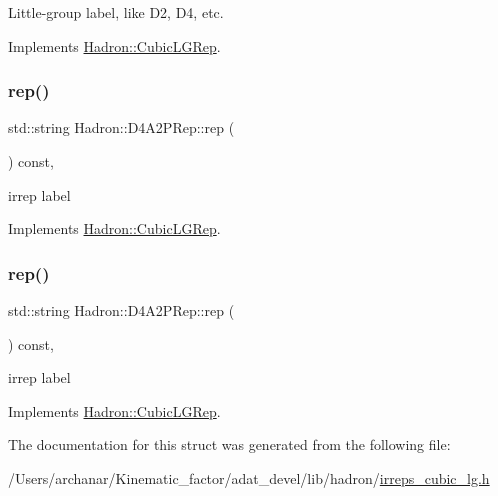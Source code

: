 Little-\/group label, like D2, D4, etc. 

Implements \mbox{\hyperlink{structHadron_1_1CubicLGRep_a9bdb14b519a611d21379ed96a3a9eb41}{Hadron\+::\+Cubic\+L\+G\+Rep}}.

\mbox{\label{structHadron_1_1D4A2PRep_a0d17ee51770f635eb312b9da22dd1c1f}} 
\subsubsection{\texorpdfstring{rep()}{rep()}\hspace{0.1cm}{\footnotesize\ttfamily [1/2]}}
{\footnotesize\ttfamily std\+::string Hadron\+::\+D4\+A2\+P\+Rep\+::rep (\begin{DoxyParamCaption}{ }\end{DoxyParamCaption}) const\hspace{0.3cm}{\ttfamily [inline]}, {\ttfamily [virtual]}}

irrep label 

Implements \mbox{\hyperlink{structHadron_1_1CubicLGRep_a50f5ddbb8f4be4cee0106fa9e8c75e6c}{Hadron\+::\+Cubic\+L\+G\+Rep}}.

\mbox{\label{structHadron_1_1D4A2PRep_a0d17ee51770f635eb312b9da22dd1c1f}} 
\subsubsection{\texorpdfstring{rep()}{rep()}\hspace{0.1cm}{\footnotesize\ttfamily [2/2]}}
{\footnotesize\ttfamily std\+::string Hadron\+::\+D4\+A2\+P\+Rep\+::rep (\begin{DoxyParamCaption}{ }\end{DoxyParamCaption}) const\hspace{0.3cm}{\ttfamily [inline]}, {\ttfamily [virtual]}}

irrep label 

Implements \mbox{\hyperlink{structHadron_1_1CubicLGRep_a50f5ddbb8f4be4cee0106fa9e8c75e6c}{Hadron\+::\+Cubic\+L\+G\+Rep}}.



The documentation for this struct was generated from the following file\+:\begin{DoxyCompactItemize}
\item 
/\+Users/archanar/\+Kinematic\+\_\+factor/adat\+\_\+devel/lib/hadron/\mbox{\hyperlink{lib_2hadron_2irreps__cubic__lg_8h}{irreps\+\_\+cubic\+\_\+lg.\+h}}\end{DoxyCompactItemize}
